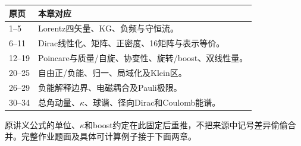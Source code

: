 \begin{longtable}{p{}p{}}
\toprule 原页 & 本章对应\\\midrule\endhead
1--5 & Lorentz四矢量、KG、负频与守恒流。\\
6--11 & Dirac线性化、矩阵、正密度、16矩阵与表示等价。\\
12--19 & Poincare与质量/自旋、协变性、旋转/boost、双线性量。\\
20--25 & 自由正/负能、归一、局域化及Klein区。\\
26--29 & 负能解释边界、电磁耦合及Pauli极限。\\
30--34 & 总角动量、$\kappa$、球谐、径向Dirac和Coulomb能谱。\\
\bottomrule\end{longtable}
原讲义公式的单位、$\kappa$和boost约定在此固定后重推，不把来源中记号差异偷偷合并。完整作业题面及具体可计算例子接于下面两章。
